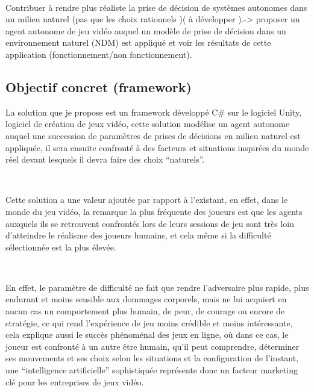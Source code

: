 ~\par
Contribuer à rendre plus réaliste la prise de décision de systèmes autonomes dans un milieu naturel (pas que les choix rationnels )( à développer ).-> proposer un agent autonome de jeu vidéo auquel un modèle de prise de décision dans un environnement naturel (NDM) est appliqué et voir les résultats de cette application (fonctionnement/non fonctionnement).


\subsection{Objectif concret (framework)}

La solution que je propose est un framework développé C# sur le logiciel Unity, logiciel de création de jeux vidéo, cette solution modélise un agent autonome auquel une succession de paramètres de prises de décisions en milieu naturel est appliquée, il sera ensuite confronté à des facteurs et situations inspirées du monde réel devant lesquels il devra faire des choix “naturels”.

~\par
Cette solution a une valeur ajoutée par rapport à l'existant, en effet, dans le monde du jeu vidéo, la remarque la plus fréquente des joueurs est que les agents auxquels ils se retrouvent confrontés lors de leurs sessions de jeu sont très loin d’atteindre le réalisme des joueurs humains, et cela même si la difficulté sélectionnée est la plus élevée.

~\par
En effet, le paramètre de difficulté ne fait que rendre l’adversaire plus rapide, plus endurant et moins sensible aux dommages corporels,  mais ne lui acquiert en aucun cas un comportement plus humain, de peur, de courage ou encore de stratégie, ce qui rend l'expérience de jeu moins crédible et moins intéressante, cela explique aussi le succès phénoménal des jeux en ligne, où dans ce cas, le joueur est confronté à un autre être humain, qu’il peut comprendre, déterminer ses mouvements et ses choix selon les situations et la configuration de l’instant, une “intelligence artificielle” sophistiquée représente donc un facteur marketing clé pour les entreprises de jeux vidéo. 

